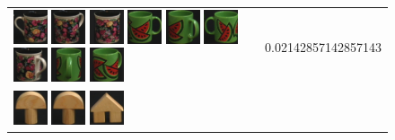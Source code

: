 \begin{figure}[tbp]
\begin{center}
\begin{tabular}{m{11cm} | m{3cm} |}
\includegraphics[width=1cm]{coil/beeld-61.eps}
\includegraphics[width=1cm]{coil/beeld-63.eps}
\includegraphics[width=1cm]{coil/beeld-62.eps}
\includegraphics[width=1cm]{coil/beeld-30.eps}
\includegraphics[width=1cm]{coil/beeld-34.eps}
\includegraphics[width=1cm]{coil/beeld-31.eps}
\includegraphics[width=1cm]{coil/beeld-64.eps}
\includegraphics[width=1cm]{coil/beeld-35.eps}
\includegraphics[width=1cm]{coil/beeld-33.eps}
& {\scriptsize 0.02142857142857143}
\\
\includegraphics[width=1cm]{coil/beeld-0.eps}
\includegraphics[width=1cm]{coil/beeld-1.eps}
\includegraphics[width=1cm]{coil/beeld-42.eps}

\end{tabular}
\end{center}
\end{figure}

